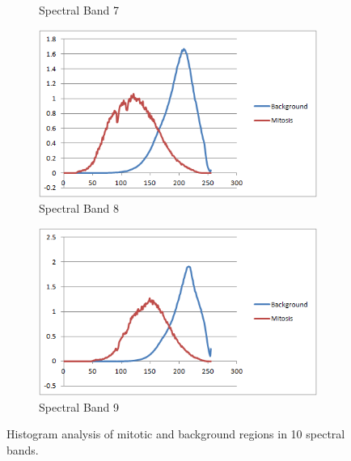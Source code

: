 \documentclass[10pt,twocolumn,letterpaper]{article}
\begin{document}
\begin{figure}[b]
\begin{subfigure}[b]{0.22\textwidth}
		\caption*{Spectral Band 7}
	\end{subfigure}
	\begin{subfigure}[b]{0.22\textwidth}
		\includegraphics[width=\textwidth]{diagrams/Band8.png}
		\caption*{Spectral Band 8}
	\end{subfigure}
	\begin{subfigure}[b]{0.22\textwidth}
		\includegraphics[width=\textwidth]{diagrams/Band9.png}
		\caption*{Spectral Band 9}
	\end{subfigure}
	\caption{Histogram analysis of mitotic and background regions in 10 spectral bands.}
	\label{fig:bands_histogram}	
\end{figure}
\end{document}
